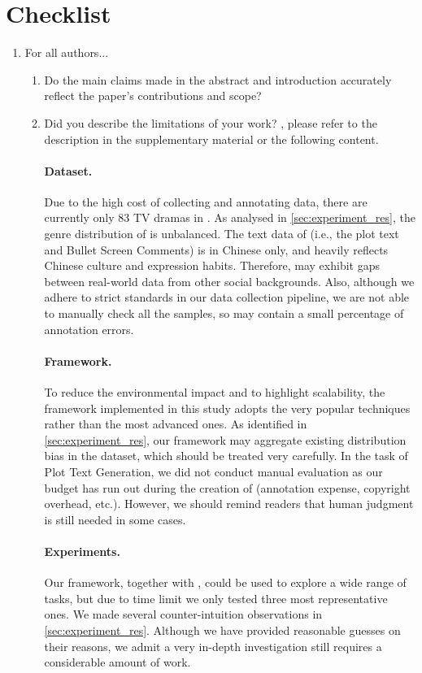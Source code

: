 \section*{Checklist}

\begin{enumerate}

\item For all authors...
\begin{enumerate}
  \item Do the main claims made in the abstract and introduction accurately reflect the paper's contributions and scope?
    \answerYes{}
  \item Did you describe the limitations of your work?
    \answerYes{}, please refer to the description in the supplementary material or the following content.

    \paragraph{Dataset.}
    Due to the high cost of collecting and annotating data, there are currently only 83 TV dramas in \TVD.
    As analysed in \cref{sec:experiment_res}, the genre distribution of \TVD is unbalanced.
    The text data of \TVD (i.e., the plot text and Bullet Screen Comments) is in Chinese only, and heavily reflects Chinese culture and expression habits. Therefore, \TVD may exhibit gaps between real-world data from other social backgrounds.
    Also, although we adhere to strict standards in our data collection pipeline, we are not able to manually check all the samples, so \TVD may contain a small percentage of annotation errors.

    \paragraph{Framework.}
    To reduce the environmental impact and to highlight scalability, the framework implemented in this study adopts the very popular techniques rather than the most advanced ones.
    As identified in \cref{sec:experiment_res}, our framework may aggregate existing distribution bias in the dataset, which should be treated very carefully.
    In the task of Plot Text Generation, we did not conduct manual evaluation as our budget has run out during the creation of \TVD (annotation expense, copyright overhead, etc.).
    However, we should remind readers that human judgment is still needed in some cases.

    \paragraph{Experiments.}
    Our framework, together with \TVD, could be used to explore a wide range of tasks, but due to time limit we only tested three most representative ones.
    We made several counter-intuition observations in  \cref{sec:experiment_res}. Although we have provided reasonable guesses on their reasons, we admit a very in-depth investigation still requires a considerable amount of work.


\end{enumerate}
\end{enumerate}
